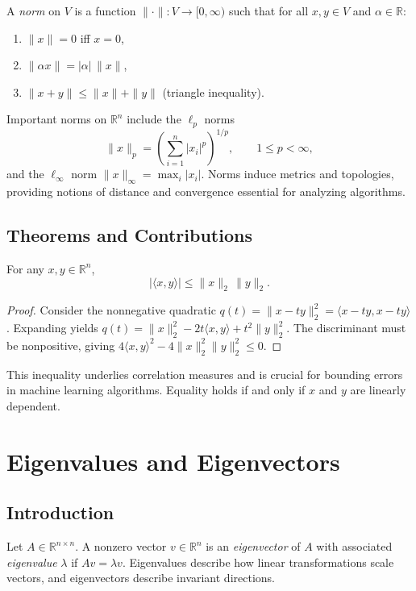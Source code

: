 \begin{definition}[Norm]
A \emph{norm} on $V$ is a function $\|\cdot\|:V\to[0,\infty)$ such that for all $x,y\in V$ and $\alpha\in\mathbb{R}$:
\begin{enumerate}
    \item $\|x\|=0$ iff $x=0$,
    \item $\|\alpha x\|=|\alpha|\,\|x\|$,
    \item $\|x+y\|\le \|x\|+\|y\|$ (triangle inequality).
\end{enumerate}
\end{definition}
Important norms on $\mathbb{R}^n$ include the $\ell_p$ norms
\begin{equation}
\|x\|_p = \left(\sum_{i=1}^n |x_i|^p\right)^{1/p},\qquad 1\le p<\infty,
\end{equation}
and the $\ell_\infty$ norm $\|x\|_\infty=\max_i|x_i|$. Norms induce metrics and topologies, providing notions of distance and convergence essential for analyzing algorithms.

\subsection{Theorems and Contributions}
\begin{theorem}
For any $x,y\in\mathbb{R}^n$,
\begin{equation}
|\langle x,y\rangle|\le \|x\|_2\,\|y\|_2.
\end{equation}
\end{theorem}
\begin{proof}
Consider the nonnegative quadratic $q(t)=\|x-ty\|_2^2=\langle x-ty,x-ty\rangle$. Expanding yields $q(t)=\|x\|_2^2-2t\langle x,y\rangle+t^2\|y\|_2^2$. The discriminant must be nonpositive, giving $4\langle x,y\rangle^2-4\|x\|_2^2\|y\|_2^2\le0$.
\end{proof}
This inequality underlies correlation measures and is crucial for bounding errors in machine learning algorithms. Equality holds if and only if $x$ and $y$ are linearly dependent.

\section{Eigenvalues and Eigenvectors}
\subsection{Introduction}
Let $A\in\mathbb{R}^{n\times n}$. A nonzero vector $v\in\mathbb{R}^n$ is an \emph{eigenvector} of $A$ with associated \emph{eigenvalue} $\lambda$ if $Av=\lambda v$. Eigenvalues describe how linear transformations scale vectors, and eigenvectors describe invariant directions.

